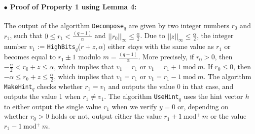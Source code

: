 \documentclass[runningheads]{llncs}
\numberwithin{equation}{section}
\begin{document}
    \paragraph{$\bullet$ \textbf{Proof of Property 1 using Lemma 4:}} The output of the algorithm \texttt{Decompose}${}_{q}$ are given by two integer numbers ${r}_{0}$ and ${r}_{1}$, such that $0 \leq {r}_{1} < \frac{(q - 1)}{\alpha}$ and ${|| {r}_{0} ||}_{\infty} \leq \frac{\alpha}{2}$. Due to ${|| z ||}_{\infty} \leq \frac{\alpha}{2}$, the integer number ${v}_{1}$ := \texttt{HighBits}${}_{q}$($r + z, \alpha$) either stays with the same value as ${r}_{1}$ or becomes equal to ${r}_{1} \pm 1$ modulo $m = \frac{(q - 1)}{\alpha}$. More precisely, if ${r}_{0} > 0$, then $-\frac{\alpha}{2} < {r}_{0} + z \leq \alpha$, which implies that ${v}_{1} = {r}_{1}$ or ${v}_{1} = {r}_{1} + 1\ \text{mod}\ m$. If ${r}_{0} \leq 0$, then $-\alpha \leq {r}_{0} + z \leq \frac{\alpha}{2}$, which implies that ${v}_{1} = {r}_{1}$ or ${v}_{1} = {r}_{1} - 1\ \text{mod}\ m$. The algorithm \texttt{MakeHint}${}_{q}$ checks whether ${r}_{1} = {v}_{1}$ and outputs the value $0$ in that case, and outputs the value $1$ when ${r}_{1} \neq {v}_{1}$. The algorithm \texttt{UseHint}${}_{q}$ uses the hint vector $h$ to either output the single value ${r}_{1}$ when we verify $y = 0$ or, depending on whether ${r}_{0} > 0$ holds or not, output either the value ${r}_{1} + 1\ \text{mod}{}^{+}\ m$ or the value ${r}_{1} - 1\ \text{mod}{}^{+}\ m$.
    
\end{document}
